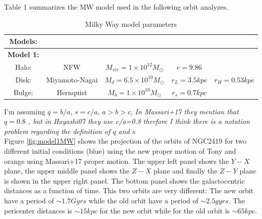 \documentclass[14pt]{article}
\begin{document}
Table 1 summarizes the MW model used in the following orbit analyzes.

\begin{table}[H]
\centering
\begin{tabular}{c c c c c}
\hline
\hline
\textbf{Models:} & & & & \\
\hline
\textbf{Model 1:} & & & & \\
Halo: & NFW & $M_{vir} = 1\times 10^{12} M_{\odot}$ & $c=9.86$  \\
Disk: & Miyamoto-Nagai & $M_{d} = 6.5\times10^{10} M_{\odot}$ & $r_L = 3.5 kpc$ & $r_H = 0.53 kpc$ \\
Bulge: & Hernquist & $M_b = 1 \times 10^{10} M_{\odot}$ & $r_s=0.7 kpc$ & \\
\hline
\hline
\end{tabular}
\caption{Milky Way model parameters}
\end{table}

I'm assuming $q=b/a$, $s=c/a$, $a>b>c$, \textit{In Massari+17 they
mention that $q=0.8$ , but in Hayashi07 they use c/a=0.8 therfore I
think there is a notation problem regardinq the definition of $q$ and
$s$ }\\

Figure \ref{fig:model1MW} shows the projection of the orbits of
NGC2419 for two different initial conditions (blue) using the new
proper motion of Tony and orange using Massari+17 proper motion.
The upper left panel shows the $Y-X$ plane, the upper middle panel
shows the $Z-X$ plane and finally the $Z-Y$ plane is shown in the
upper right panel. The bottom panel shows the galactocentric
distances as a function of time. This two orbits are very different:
The new orbit have a period of $\sim 1.7 Gyrs$ while the old orbit have a
period of $\sim 2.5 gyrs$. The pericenter distances is $\sim 15 kpc$
for the new orbit while for the old orbit is $\sim 65 kpc$.
\end{document}
